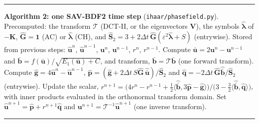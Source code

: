 \begin{algorithm}[t]\small\hrule\smallskip
\noindent\textbf{Algorithm 2: one SAV-BDF2 time step} (\texttt{ihaar/phasefield.py}).
Precomputed: the transform $\mathcal T$ (DCT-II, or the eigenvectors $\mathbf V$), the symbols $\hat{\boldsymbol\lambda}$ of
$-\mathbf K$, $\hat{\mathbf G}=\mathbf 1$ (AC) or $\hat{\boldsymbol\lambda}$ (CH), and $\hat{\mathbf S}_2=3+2\Delta t\,\hat{\mathbf G}(\varepsilon^2\hat{\boldsymbol\lambda}+S)$ (entrywise).
Stored from previous steps: $\hat{\mathbf u}^n$, $\hat{\mathbf u}^{n-1}$, $\mathbf u^n$, $\mathbf u^{n-1}$, $r^n$, $r^{n-1}$.
 Compute $\bar{\mathbf u}=2\mathbf u^n-\mathbf u^{n-1}$ and $\bar{\mathbf b}=f(\bar{\mathbf u})/\sqrt{E_1(\bar{\mathbf u})+C}$, and transform, $\hat{\bar{\mathbf b}}=\mathcal T\bar{\mathbf b}$ (one forward transform).
 Compute $\hat{\mathbf g}=4\hat{\mathbf u}^n-\hat{\mathbf u}^{n-1}$, $\hat{\mathbf p}=(\hat{\mathbf g}+2\Delta t\,S\hat{\mathbf G}\,\hat{\bar{\mathbf u}})/\hat{\mathbf S}_2$ and $\hat{\mathbf q}=-2\Delta t\,\hat{\mathbf G}\hat{\bar{\mathbf b}}/\hat{\mathbf S}_2$ (entrywise).
 Update the scalar, $r^{n+1}=\big(4r^n-r^{n-1}+\tfrac12\langle\hat{\bar{\mathbf b}},3\hat{\mathbf p}-\hat{\mathbf g}\rangle\big)/\big(3-\tfrac32\langle\hat{\bar{\mathbf b}},\hat{\mathbf q}\rangle\big)$, with inner products evaluated in the orthonormal transform domain.
 Set $\hat{\mathbf u}^{n+1}=\hat{\mathbf p}+r^{n+1}\hat{\mathbf q}$ and $\mathbf u^{n+1}=\mathcal T^{-1}\hat{\mathbf u}^{n+1}$ (one inverse transform).
\smallskip\hrule
\end{algorithm}

